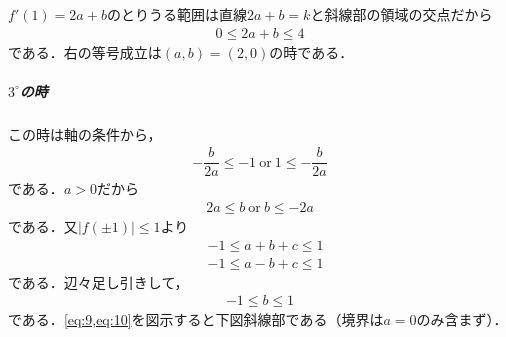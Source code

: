 \documentclass[../../main.tex]{subfiles}
\begin{document}
$f'(1)=2a+b$のとりうる範囲は直線$2a+b=k$と斜線部の領域の交点だから
\begin{align}
  0\le2a+b\le4
\end{align}
である．右の等号成立は$(a,b)=(2,0)$の時である．

\subparagraph{$3^{\circ}$の時}

この時は軸の条件から，
\begin{align}
  -\dfrac{b}{2a}\le-1 \ \text{or}\ 1\le-\dfrac{b}{2a}
\end{align}
である．$a>0$だから
\begin{align}
  2a\le b \ \text{or}\ b\le-2a \label{eq:9}
\end{align}
である．又$|f(\pm 1)| \le 1$より
\begin{align}
  & -1 \le a+ b + c \le 1 \\
  & -1 \le a- b + c \le 1
\end{align}
である．辺々足し引きして，
\begin{align}
  -1 \le b \le 1 \label{eq:10}
\end{align}
である．\cref{eq:9,eq:10}を図示すると下図斜線部である（境界は$a=0$のみ含まず）．
\end{document}

